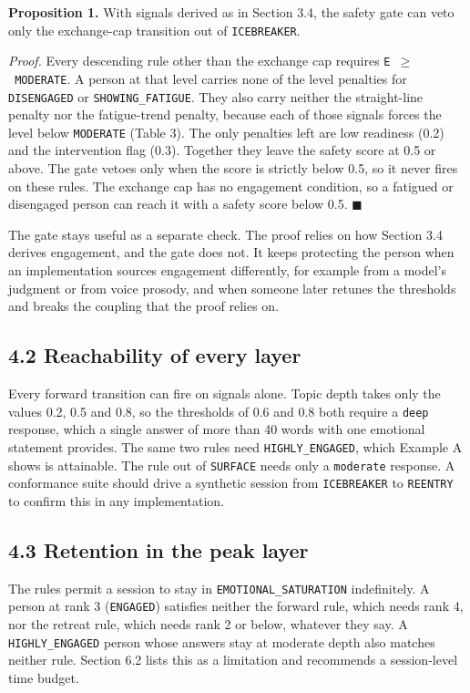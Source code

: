 \documentclass[11pt]{article}
\begin{document}
\textbf{Proposition 1.} With signals derived as in Section 3.4, the
safety gate can veto only the exchange-cap transition out of
\texttt{ICEBREAKER}.

\emph{Proof.} Every descending rule other than the exchange cap requires
\texttt{E\ $\geq$\ MODERATE}. A person at that level carries none of the
level penalties for \texttt{DISENGAGED} or \texttt{SHOWING\_\allowbreak{}FATIGUE}.
They also carry neither the straight-line penalty nor the fatigue-trend
penalty, because each of those signals forces the level below
\texttt{MODERATE} (Table 3). The only penalties left are low readiness
(0.2) and the intervention flag (0.3). Together they leave the safety
score at 0.5 or above. The gate vetoes only when the score is strictly
below 0.5, so it never fires on these rules. The exchange cap has no
engagement condition, so a fatigued or disengaged person can reach it
with a safety score below 0.5. \hfill$\blacksquare$

The gate stays useful as a separate check. The proof relies on how
Section 3.4 derives engagement, and the gate does not. It keeps
protecting the person when an implementation sources engagement
differently, for example from a model's judgment or from voice prosody,
and when someone later retunes the thresholds and breaks the coupling
that the proof relies on.

\subsection{4.2 Reachability of every layer}

Every forward transition can fire on signals alone. Topic depth takes
only the values 0.2, 0.5 and 0.8, so the thresholds of 0.6 and 0.8 both
require a \texttt{deep} response, which a single answer of more than 40
words with one emotional statement provides. The same two rules need
\texttt{HIGHLY\_\allowbreak{}ENGAGED}, which Example A shows is attainable. The rule
out of \texttt{SURFACE} needs only a \texttt{moderate} response. A
conformance suite should drive a synthetic session from
\texttt{ICEBREAKER} to \texttt{REENTRY} to confirm this in any
implementation.

\subsection{4.3 Retention in the peak layer}

The rules permit a session to stay in \texttt{EMOTIONAL\_\allowbreak{}SATURATION}
indefinitely. A person at rank 3 (\texttt{ENGAGED}) satisfies neither
the forward rule, which needs rank 4, nor the retreat rule, which needs
rank 2 or below, whatever they say. A \texttt{HIGHLY\_\allowbreak{}ENGAGED} person
whose answers stay at moderate depth also matches neither rule. Section
6.2 lists this as a limitation and recommends a session-level time
budget.
\end{document}
